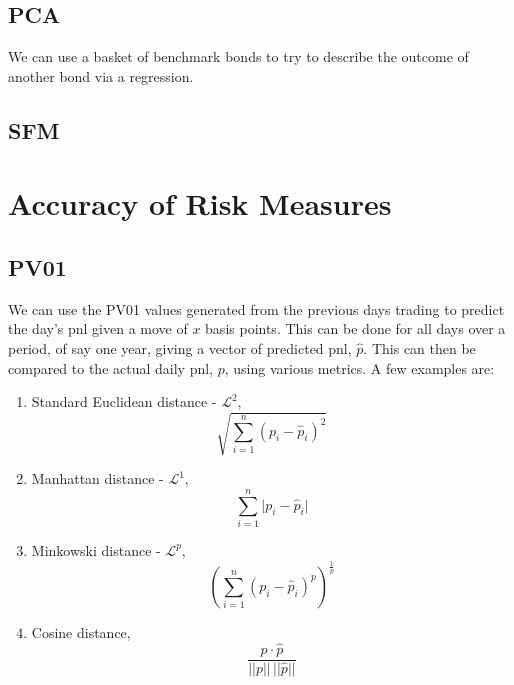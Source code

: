 \documentclass[12pt&a4paper]{article}
\numberwithin{equation}{section}
\def\cL{\mathcal{L}}
\begin{document}
\subsection{PCA}
We can use a basket of benchmark bonds to try to describe the outcome of another bond via a regression. 

\subsection{SFM}	

\section{Accuracy of Risk Measures}
\subsection{PV01}
We can use the PV01 values generated from the previous days trading to predict the day's pnl given a move of $x$ basis points. This can be done for all days over a period, of say one year, giving a vector of predicted pnl, $\hat{p}$. This can then be compared to the actual daily pnl, $p$, using various metrics. A few examples are:
\begin{enumerate}
	\item Standard Euclidean distance - $\cL^2$, 
	\[
	\sqrt{\sum_{i=1}^{n}(p_i-\hat{p}_i)^2}
	\]
	\item Manhattan distance - $\cL^1$,
	\[
	\sum_{i=1}^{n}\lvert p_i - \hat{p}_i\rvert
	\]
	\item Minkowski distance - $\cL^p$,
	\[
	\left(\sum_{i=1}^{n}(p_i-\hat{p}_i)^p \right)^{\frac{1}{p}}
	\]
	\item Cosine distance,
	\[
	\frac{p\cdot \hat{p}}{||p||\, ||\hat{p}||}
	\]
\end{enumerate}
\end{document}
